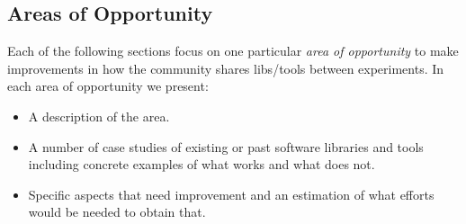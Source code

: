 \subsection{Areas of Opportunity}

Each of the following sections focus on one particular \textit{area of opportunity} to make improvements in how the community shares libs/tools between experiments.  In each area of opportunity we present:

\begin{itemize}
\item A description of the area.
\item A number of case studies of existing or past software libraries and tools including concrete examples of what works and what does not.
\item Specific aspects that need improvement and an estimation of what efforts would be needed to obtain that.
\end{itemize}

